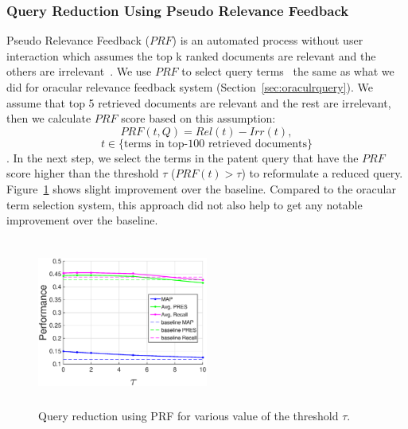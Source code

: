 \subsubsection{Query Reduction Using Pseudo Relevance Feedback}
Pseudo Relevance Feedback ($\mathit{PRF}$) is an automated process without user interaction which assumes the top k ranked documents are relevant and the others are irrelevant~\citep{Baeza-Yates2011}. We use $\mathit{PRF}$ to select query terms~\cite{maxwell2013compact} the same as what we did for oracular relevance feedback system (Section~\ref{sec:oraculrquery}). We assume that top 5 retrieved documents are relevant and the rest are irrelevant, then we calculate $\mathit{PRF}$ score based on this assumption:  
\begin{equation}
PRF(t,Q)=Rel(t)-Irr(t), 
 \label{eq:score}
\end{equation}
\vspace*{-2ex}
\begin{displaymath}t\in \lbrace \mbox{terms in top-100 retrieved documents}\rbrace\end{displaymath}.
In the next step, we select the terms in the patent query that have the $\mathit{PRF}$ score higher than the threshold $\tau$ ($PRF(t)>\tau$) to reformulate a reduced query. Figure~\ref{fig:prf} shows slight improvement over the baseline. Compared to the oracular term selection system, this approach did not also help to get any notable improvement over the baseline.
\begin{figure}[t!]
   \centering
   \includegraphics[width=0.50\textwidth,height=55mm]{figs/prf.eps}
   \caption{Query reduction using PRF for various value of the threshold $\tau$.}   
   \label{fig:prf} 
\end{figure}
